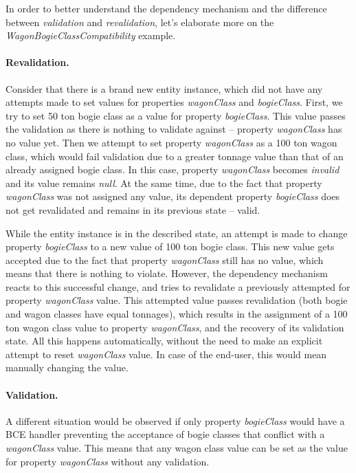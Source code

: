   In order to better understand the dependency mechanism and the difference between \emph{validation} and \emph{revalidation}, let's elaborate more on the \emph{WagonBogieClassCompatibility} example.
  
  \paragraph*{Revalidation.}
  Consider that there is a brand new entity instance, which did not have any attempts made to set values for properties \emph{wagonClass} and \emph{bogieClass}.
  First, we try to set 50 ton bogie class as a value for property \emph{bogieClass}.
  This value passes the validation as there is nothing to validate against -- property \emph{wagonClass} has no value yet.
  Then we attempt to set property \emph{wagonClass} as a 100 ton wagon class, which would fail validation due to a greater tonnage value than that of an already assigned bogie class.
  In this case, property \emph{wagonClass} becomes \emph{invalid} and its value remains \emph{null}.
  At the same time, due to the fact that property \emph{wagonClass} was not assigned any value, its dependent property \emph{bogieClass} does not get revalidated and remains in its previous state -- valid.
 
  While the entity instance is in the described state, an attempt is made to change property \emph{bogieClass} to a new value of 100 ton bogie class.
  This new value gets accepted due to the fact that property \emph{wagonClass} still has no value, which means that there is nothing to violate.
  However, the dependency mechanism reacts to this successful change, and tries to revalidate a previously attempted for property \emph{wagonClass} value.
  This attempted value passes revalidation (both bogie and wagon classes have equal tonnages), which results in the assignment of a 100 ton wagon class value to property \emph{wagonClass}, and the recovery of its validation state.
  All this happens automatically, without the need to make an explicit attempt to reset \emph{wagonClass} value.
  In case of the end-user, this would mean manually changing the value.

  \paragraph*{Validation.}
  A different situation would be observed if only property \emph{bogieClass} would have a BCE handler preventing the acceptance of bogie classes that conflict with a \emph{wagonClass} value.
  This means that any wagon class value can be set as the value for property \emph{wagonClass} without any validation.
  
